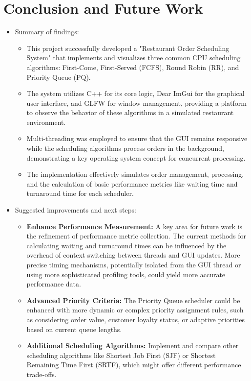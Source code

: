 \documentclass[a4paper,12pt]{article}
\begin{document}
\section{Conclusion and Future Work}
\begin{itemize}
    \item Summary of findings:
        \begin{itemize}
            \item This project successfully developed a "Restaurant Order Scheduling System" that implements and visualizes three common CPU scheduling algorithms: First-Come, First-Served (FCFS), Round Robin (RR), and Priority Queue (PQ).
            \item The system utilizes C++ for its core logic, Dear ImGui for the graphical user interface, and GLFW for window management, providing a platform to observe the behavior of these algorithms in a simulated restaurant environment.
            \item Multi-threading was employed to ensure that the GUI remains responsive while the scheduling algorithms process orders in the background, demonstrating a key operating system concept for concurrent processing.
            \item The implementation effectively simulates order management, processing, and the calculation of basic performance metrics like waiting time and turnaround time for each scheduler.
        \end{itemize}
    \item Suggested improvements and next steps:
        \begin{itemize}
            \item \textbf{Enhance Performance Measurement:} A key area for future work is the refinement of performance metric collection. The current methods for calculating waiting and turnaround times can be influenced by the overhead of context switching between threads and GUI updates. More precise timing mechanisms, potentially isolated from the GUI thread or using more sophisticated profiling tools, could yield more accurate performance data.
            \item \textbf{Advanced Priority Criteria:} The Priority Queue scheduler could be enhanced with more dynamic or complex priority assignment rules, such as considering order value, customer loyalty status, or adaptive priorities based on current queue lengths.
            \item \textbf{Additional Scheduling Algorithms:} Implement and compare other scheduling algorithms like Shortest Job First (SJF) or Shortest Remaining Time First (SRTF), which might offer different performance trade-offs.

\end{itemize}
\end{itemize}
\end{document}
